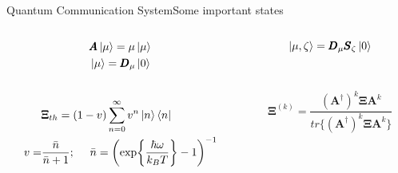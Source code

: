 \begin{frame}{Quantum Communication System}{Some important states}
    \begin{columns}

        \begin{column}{0.5\textwidth}
            \begin{equation*}\begin{split}
                &\pmb{A}\ket{\mu}=\mu\ket{\mu}\\
                &\ket{\mu}=\pmb{D}_\mu\ket{0}
            \end{split}\end{equation*}
            \\ \mbox{}
            \begin{equation*}\begin{split}
                &\pmb{\Xi}_{th}=(1-v)\sum_{n=0}^{\infty}v^n\ket{n}\bra{n}\\
                v=&\frac{\bar{n}}{\bar{n}+1};\ \ \ \ 
                \bar{n}=\left(\exp{\frac{\hbar\omega}{k_B T}}-1\right)^{-1}
            \end{split}\end{equation*}
        \end{column}
        \begin{column}{0.5\textwidth}
            \begin{equation*}
                \ket{\mu,\zeta}=\pmb{D}_\mu\pmb{S}_\zeta\ket{0}
            \end{equation*}
            \\ \mbox{}
            \\
            \begin{equation*}
                \pmb{\Xi}^{(k)}=\frac{(\pmb{A}^\dagger)^k\pmb{\Xi}\pmb{A}^k}
                {tr\{(\pmb{A}^\dagger)^k\pmb{\Xi}\pmb{A}^k\}}
            \end{equation*}
            \mbox{}
            \mbox{}
        \end{column}
    \end{columns}

    \ \\ \mbox{} \\ \ \mbox{}
\end{frame}